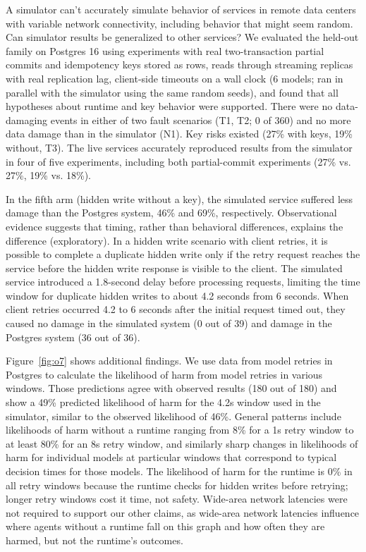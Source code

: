 \documentclass[letterpaper,twocolumn,10pt]{article}
\begin{document}
A simulator can't accurately simulate behavior of services in remote data centers with variable network connectivity, including behavior that might seem random. Can simulator results be generalized to other services? We evaluated the held-out family on Postgres 16 using experiments with real two-transaction partial commits and idempotency keys stored as rows, reads through streaming replicas with real replication lag, client-side timeouts on a wall clock (6 models; ran in parallel with the simulator using the same random seeds), and found that all hypotheses about runtime and key behavior were supported. There were no data-damaging events in either of two fault scenarios (T1, T2; 0 of 360) and no more data damage than in the simulator (N1). Key risks existed (27\% with keys, 19\% without, T3). The live services accurately reproduced results from the simulator in four of five experiments, including both partial-commit experiments (27\% vs. 27\%, 19\% vs. 18\%).

In the fifth arm (hidden write without a key), the simulated service suffered less damage than the Postgres system, 46\% and 69\%, respectively. Observational evidence suggests that timing, rather than behavioral differences, explains the difference (exploratory). In a hidden write scenario with client retries, it is possible to complete a duplicate hidden write only if the retry request reaches the service before the hidden write response is visible to the client. The simulated service introduced a 1.8-second delay before processing requests, limiting the time window for duplicate hidden writes to about 4.2 seconds from 6 seconds. When client retries occurred 4.2 to 6 seconds after the initial request timed out, they caused no damage in the simulated system (0 out of 39) and damage in the Postgres system (36 out of 36).

Figure~\ref{fig:o7} shows additional findings. We use data from model retries in Postgres to calculate the likelihood of harm from model retries in various windows. Those predictions agree with observed results (180 out of 180) and show a 49\% predicted likelihood of harm for the 4.2s window used in the simulator, similar to the observed likelihood of 46\%. General patterns include likelihoods of harm without a runtime ranging from 8\% for a 1s retry window to at least 80\% for an 8s retry window, and similarly sharp changes in likelihoods of harm for individual models at particular windows that correspond to typical decision times for those models. The likelihood of harm for the runtime is 0\% in all retry windows because the runtime checks for hidden writes before retrying; longer retry windows cost it time, not safety. Wide-area network latencies were not required to support our other claims, as wide-area network latencies influence where agents without a runtime fall on this graph and how often they are harmed, but not the runtime's outcomes.
\end{document}
